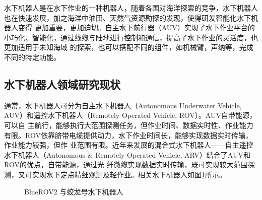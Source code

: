 水下机器人是在水下作业的一种机器人，随着各国对海洋探索的竞争，水下机器人也在快速发展，加之海洋中油田、天然气资源勘探的发现，使得研发智能化水下机器人变得
更加重要，更加迫切。自主水下航行器（AUV）实现了水下作业平台的小巧化、智能化，通过线缆与陆地进行控制和通信，提高了水下作业的灵活度，也更加适用于未知海域
的探索，也可以搭配不同的组件，如机械臂，声纳等，完成不同的特定功能。

\subsection{水下机器人领域研究现状}

通常，水下机器人可分为自主水下机器人（Autonomous Underwater Vehicle, AUV）和遥控水下机器人（Remotely Operated Vehicle, ROV）。AUV自带能源，可以自
主航行，能够执行大范围探测任务，但作业时间、数据实时性、作业能力有限。ROV依靠脐带电缆提供动力，水下作业时间长，能够实现数据实时传输，作业能力较强，但作
业范围有限。近年来发展的混合式水下机器人——自主遥控水下机器人（Autonomous \& Remotely Operated Vehicle, ARV）结合了AUV和ROV的优点，自带能源，通过光
纤微缆实现数据实时传输，既可实现较大范围探测，又可实现水下定点精细观测及轻作业。相关水下机器人如图\ref{fig:rov-comparison}所示。

\begin{figure}[!ht]
  \setlength{\subfigcapskip}{-1bp}
  \centering
  \newsavebox{\standardrov}
  \begin{minipage}{\textwidth}
    \centering
    \hspace{0.8em}
  \end{minipage}

  \caption{BlueROV2 与蛟龙号水下机器人}
  \label{fig:rov-comparison}
\end{figure}

